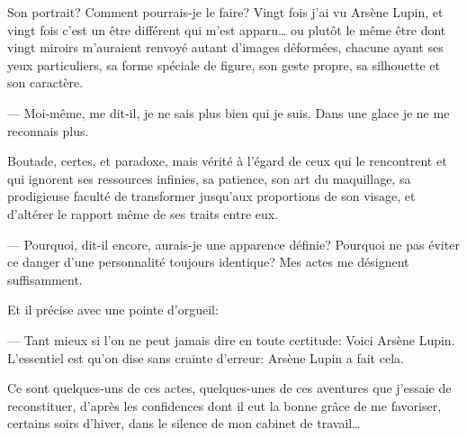\documentclass[12pt,a4paper]{article}
\begin{document}
Son portrait? Comment pourrais-je le faire? Vingt fois j’ai vu Arsène Lupin, et vingt fois c’est un être différent qui m’est apparu… ou plutôt le même être dont vingt miroirs m’auraient renvoyé autant d’images déformées, chacune ayant ses yeux particuliers, sa forme spéciale de figure, son geste propre, sa silhouette et son caractère.

— Moi-même, me dit-il, je ne sais plus bien qui je suis. Dans une glace je ne me reconnais plus.

Boutade, certes, et paradoxe, mais vérité à l’égard de ceux qui le rencontrent et qui ignorent ses ressources infinies, sa patience, son art du maquillage, sa prodigieuse faculté de transformer jusqu’aux proportions de son visage, et d’altérer le rapport même de ses traits entre eux. 

— Pourquoi, dit-il encore, aurais-je une apparence définie? Pourquoi ne pas éviter ce danger d’une personnalité toujours identique? Mes actes me désignent suffisamment.

Et il précise avec une pointe d’orgueil:

— Tant mieux si l’on ne peut jamais dire en toute certitude: Voici Arsène Lupin. L’essentiel est qu’on dise sans crainte d’erreur: Arsène Lupin a fait cela.



Ce sont quelques-uns de ces actes, quelques-unes de ces aventures que j’essaie de reconstituer, d’après les confidences dont il eut la bonne grâce de me favoriser, certains soirs d’hiver, dans le silence de mon cabinet de travail…
\end{document}
